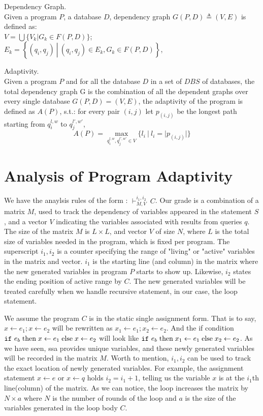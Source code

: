 \documentclass[a4paper,11pt]{article}
\begin{document}
\begin{defn}
Dependency Graph.
\\
Given a program $P$, a database $D$, 
dependency graph $G(P, D) \triangleq (V, E)$ is defined as: 
\\
$V =\bigcup \{V_k | G_k \in F(P, D)  \}$;
\\
$E_k = \left\{(q_i,q_j) 
~ \left \vert ~ (q_i,q_j) \in E_k , G_k \in F(P, D) \right.\right\}$,
\end{defn}
%
%
\begin{defn}
Adaptivity.
\\
Given a program $P$ and for all the database $D$ in a set of $DBS$ of databases, the total dependency graph G is the combination of all the dependent graphs over every single database $G(P, D) = (V, E)$, the adaptivity of the program is defined as $A(P)$, s.t.:
for every pair $(i,j)$ let $p_{(i,j)}$ be the longest path starting from $q_i^{l, w}$ to $q_j^{l',w'}$,
%
$$A(P) = \max\limits_{q_i^{l,w},q_j^{l',w'} \in V }\{l_i ~|~ l_i = |p_(i,j)| \}$$
\end{defn}
%
%
\section{Analysis of Program Adaptivity}
We have the anaylsis rules of the form : $\vdash^{i_1, i_2}_{M,V} ~ C$.  Our grade is a combination of a matrix $M$, used to track the dependency of variables appeared in the statement $S$, and a vector $V$ indicating the variables associated with results from queries $q$. The size of the matrix $M$ is $L \times L$, and vector $V$ of size $N$, where $L$ is the total size of variables needed in the program, which is fixed per program. 
The superscript $i_1,i_2$ is a counter specifying the range of "living" or "active" variables in the matrix and vector. $i_1$ is the starting line (and column) in the matrix where the new generated variables  in program $P$ starts to show up. Likewise, $i_2$ states the ending position of active range by $C$. The new generated variables will be treated carefully when we handle recursive statement, in our case, the loop statement. 

We assume the program $C$ is in the static single assignment form. That is to say, $x \leftarrow e_1; x \leftarrow e_2 $ will be rewritten as $ x_1 \leftarrow e_1; x_2 \leftarrow e_2$. And the if condition $ \mathtt{if} ~ e_b \mbox{\;then\;} x \leftarrow e_1 \mbox{\;else\;} x \leftarrow e_2  $ will look like $ \mathtt{if} ~ e_b \mbox{\;then\;} x_1 \leftarrow e_1 \mbox{\;else\;} x_2 \leftarrow e_2  $. As we have seen, ssa provides unique variables, and these newly generated variables will be recorded in the matrix $M$. Worth to mention, $i_1,i_2$ can be used to track the exact location of newly generated variables. For example, the assignment statement $x \leftarrow e$ or $x \leftarrow q $ holds $i_2 =i_1+1$, telling us the variable $x$ is at the $i_1$th line(column) of the matrix. As we can notice, the loop increases the matrix by $N \times a$ where $N$ is the number of rounds of the loop and $a$ is the size of the variables generated in the loop body $C$.
\end{document}
